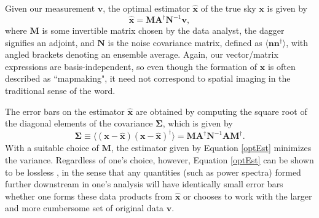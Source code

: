 \documentclass[twocolumn,apj,numberedappendix]{emulateapj}
\newcommand{\vis}{\mathbf{v}}
\newcommand{\x}{\mathbf{x}}
\newcommand{\xhat}{\hat{\mathbf{x}}}
\newcommand{\A}{\mathbf{A}}
\newcommand{\N}{\mathbf{N}}
\begin{document}
Given our measurement $\vis$, the optimal estimator $\xhat$ of the true sky
$\x$ is given by \citep{T97mapmaking,Morales2009,dillon_et_al2015}
\begin{equation}
\label{optEst}
\xhat = \mathbf{M} \A^\dagger \N^{-1} \vis,
\end{equation}
where $\mathbf{M}$ is some invertible matrix chosen by the data analyst, 
the dagger signifies an adjoint, and
$\N$ is the noise covariance matrix, defined as $\langle \mathbf{n}
\mathbf{n}^\dagger \rangle$, with angled brackets denoting an ensemble average.
Again, our vector/matrix expressions are basis-independent, so even though the
formation of $\xhat$ is often described as ``mapmaking", it need not correspond
to spatial imaging in the traditional sense of the word.

The error bars on the estimator $\xhat$ are obtained by computing the square root
of the diagonal elements of the covariance $\boldsymbol \Sigma$, which is given by
\begin{equation}
\label{eq:sigma}
\boldsymbol \Sigma \equiv \langle (\x - \xhat) ( \x - \xhat)^\dagger \rangle = \mathbf{M} \A^\dagger \N^{-1} \A\mathbf{M}^\dagger.
\end{equation}
With a suitable choice of $\mathbf{M}$, the estimator given by Equation \eqref{optEst}
minimizes the variance. Regardless of one's choice, however, Equation \eqref{optEst} 
can be shown to be lossless \citep{T97mapmaking}, in the sense that any quantities (such as power
spectra) formed further downstream in one's analysis will have identically
small error bars whether one forms these data products from $\xhat$ or chooses
to work with the larger and more cumbersome set of original data $\vis$.
%
%
%
\end{document}
